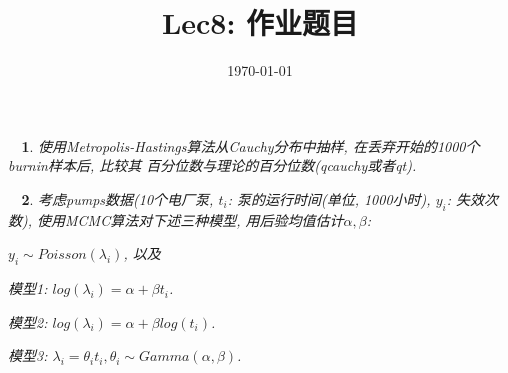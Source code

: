 \documentclass[10pt,CCT]{ctexart}
\newtheorem{prob}{~}
\begin{document}
%

\title{Lec8: 作业题目}
 \date{\today}%

\maketitle
\thispagestyle{empty}
\begin{prob}\rm
使用Metropolis-Hastings算法从Cauchy分布中抽样, 在丢弃开始的1000个burnin样本后, 比较其
百分位数与理论的百分位数(qcauchy或者qt).
\end{prob}

\begin{prob}\rm
考虑\emph{pumps}数据(10个电厂泵, $t_i$: 泵的运行时间(单位, 1000小时), $y_i$: 失效次数), 
使用MCMC算法对下述三种模型, 用后验均值估计$\alpha,\beta$:

$y_i\sim Poisson(\lambda_i)$, 以及

模型1: $log(\lambda_i)=\alpha+\beta t_i$.

模型2: $log(\lambda_i)=\alpha+\beta log(t_i)$.

模型3: $\lambda_i=\theta_it_i, \theta_i\sim Gamma(\alpha,\beta)$.

\end{prob}
\end{document}
